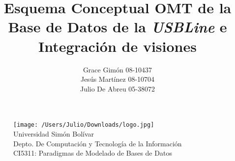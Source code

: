 \message{ !name(InformeFase2.tex)}\documentclass[12pt,a4paper,spanish]{article}
\begin{document}


\begin{figure}
  \centering
    \texttt{[image: /Users/Julio/Downloads/logo.jpg]}
     \\ Universidad Sim\'on Bol\'ivar
     \\ Depto. De Computaci\'on y Tecnolog\'ia de la Informaci\'on
     \\ CI5311: Paradigmas de Modelado de Bases de Datos
\end{figure} 

\title{Esquema Conceptual OMT de la Base de Datos de la \emph{USBLine}
e Integraci\'on de visiones}
\author{Grace Gim\'on 08-10437 \\
        Jes\'us Mart\'inez 08-10704\\
        Julio De Abreu 05-38072}

\maketitle
\newpage
\tableofcontents

\newpage
\end{document}
